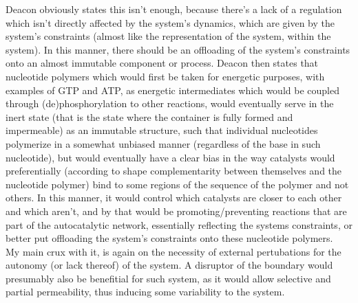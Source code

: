 \documentclass[a4paper,12pt,twoside,leqno]{article}
\begin{document}
Deacon obviously states this isn't enough, because there's a lack of a regulation which isn't directly affected by the system's dynamics, which are given by the system's constraints (almost like the representation of the system, within the system). In this manner, there should be an offloading of the system's constraints onto an almost immutable component or process. Deacon then states that nucleotide polymers which would first be taken for energetic purposes, with examples of GTP and ATP, as energetic intermediates which would be coupled through (de)phosphorylation to  other reactions, would eventually serve in the inert state (that is the state where the container is fully formed and impermeable) as an immutable structure, such that individual nucleotides polymerize  in a somewhat unbiased manner (regardless of the base in such nucleotide), but would eventually have a clear bias in the way catalysts would preferentially (according to shape complementarity between themselves and the nucleotide polymer) bind to some regions of the sequence of the polymer and not others. In this manner, it would control which catalysts are closer to each other and which aren't, and by that would be promoting/preventing reactions that are part of the autocatalytic network, essentially reflecting the systems constraints, or better put offloading the system's constraints onto these nucleotide polymers. \\
My main crux with it, is again on the necessity of external pertubations for the autonomy (or lack thereof) of the system. A disruptor of the boundary would presumably also be benefitial for such system, as it would allow selective and partial permeability, thus inducing some variability to the system.
\end{document}
